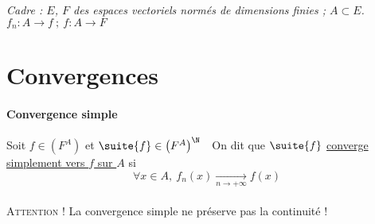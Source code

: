 

\textit{Cadre : $E$, $F$ des espaces vectoriels normés de dimensions finies ; $A\subset E$.
\\\hspace*{2.5cm} $f_n : A\longrightarrow f ~;~f : A\longrightarrow F$}
\minitoc
\section{Convergences}

\traitd
\paragraph{Convergence simple} ${}$\\
    Soit $f\in \left( F^A \right)$ et $\suite{f} \in \left( F^A \right)^{\N}~~$  On dit que $\suite{f}$ \underline{converge simplement vers 
    $f$ sur $A$} si \[ \forall x\in A , ~ f_n(x) \underset{n\rightarrow +\infty}{\longrightarrow} f(x) \] \trait \vspace*{-1.2cm}
\\{\small \textsc{Attention !} La convergence simple ne préserve pas la continuité !} \traitd
